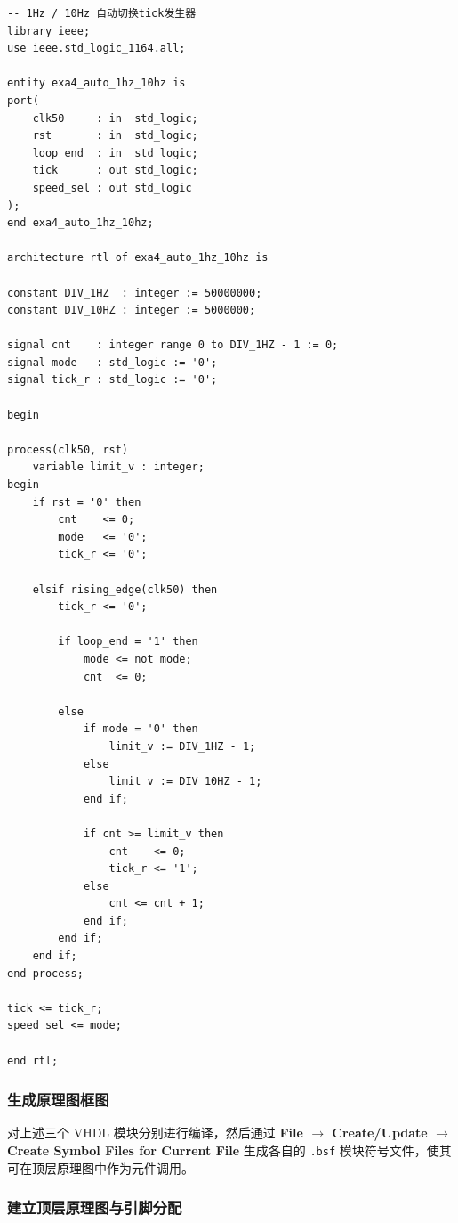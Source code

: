 \documentclass{ctexrep}
\begin{document}
\begin{verbatim}
-- 1Hz / 10Hz 自动切换tick发生器
library ieee;
use ieee.std_logic_1164.all;

entity exa4_auto_1hz_10hz is
port(
    clk50     : in  std_logic;
    rst       : in  std_logic;
    loop_end  : in  std_logic;
    tick      : out std_logic;
    speed_sel : out std_logic
);
end exa4_auto_1hz_10hz;

architecture rtl of exa4_auto_1hz_10hz is

constant DIV_1HZ  : integer := 50000000;
constant DIV_10HZ : integer := 5000000;

signal cnt    : integer range 0 to DIV_1HZ - 1 := 0;
signal mode   : std_logic := '0';
signal tick_r : std_logic := '0';

begin

process(clk50, rst)
    variable limit_v : integer;
begin
    if rst = '0' then
        cnt    <= 0;
        mode   <= '0';
        tick_r <= '0';

    elsif rising_edge(clk50) then
        tick_r <= '0';

        if loop_end = '1' then
            mode <= not mode;
            cnt  <= 0;

        else
            if mode = '0' then
                limit_v := DIV_1HZ - 1;
            else
                limit_v := DIV_10HZ - 1;
            end if;

            if cnt >= limit_v then
                cnt    <= 0;
                tick_r <= '1';
            else
                cnt <= cnt + 1;
            end if;
        end if;
    end if;
end process;

tick <= tick_r;
speed_sel <= mode;

end rtl;
\end{verbatim}
\label{e4:lst:auto}

\subsubsection{生成原理图框图}

对上述三个 VHDL 模块分别进行编译，然后通过 \textbf{File $\rightarrow$ Create/Update $\rightarrow$ Create Symbol Files for Current File} 生成各自的 \texttt{.bsf} 模块符号文件，使其可在顶层原理图中作为元件调用。

\subsubsection{建立顶层原理图与引脚分配}
\end{document}
